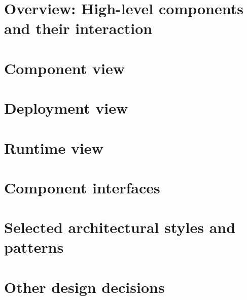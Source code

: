 \section{Overview: High-level components and their interaction}

\section{Component view}

\section{Deployment view}

\section{Runtime view}

\section{Component interfaces}

\section{Selected architectural styles and patterns}

\section{Other design decisions}
